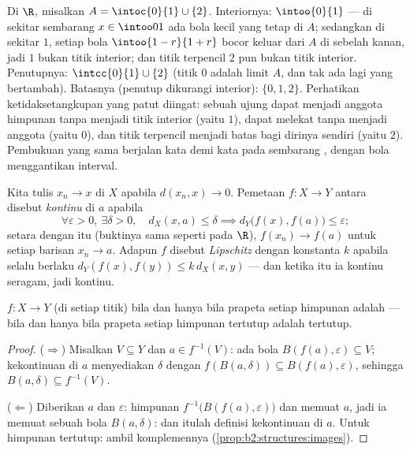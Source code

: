 \begin{example}\label{ex:b2:metric:intclosure}
Di $\R$, misalkan $A = \intoc{0}{1} \cup \{2\}$. Interiornya:
$\intoo{0}{1}$ --- di sekitar sembarang $x \in \intoo01$ ada bola kecil
yang tetap di $A$; sedangkan di sekitar $1$, setiap bola $\intoo{1-r}{1+r}$
bocor keluar dari $A$ di sebelah kanan, jadi $1$ bukan titik interior;
dan titik terpencil $2$ pun bukan titik interior. Penutupnya:
$\intcc{0}{1} \cup \{2\}$ (titik $0$ adalah limit $A$, dan tak ada
lagi yang bertambah). Batasnya (penutup dikurangi interior):
$\{0, 1, 2\}$. Perhatikan ketidaksetangkupan yang patut diingat: sebuah
ujung dapat menjadi anggota himpunan tanpa menjadi titik interior (yaitu
$1$), dapat melekat tanpa menjadi anggota (yaitu $0$), dan titik
terpencil menjadi batas bagi dirinya sendiri (yaitu $2$). Pembukuan yang
sama berjalan kata demi kata pada sembarang , dengan bola
menggantikan interval.
\end{example}

\begin{definition}\label{def:b2:metric:continuity}
Kita tulis $x_n \to x$ di $X$ apabila $d(x_n, x) \to 0$. Pemetaan $f
\colon X \to Y$ antara  disebut
\emph{kontinu} di $a$ apabila
\[
\forall \varepsilon > 0,\ \exists\delta > 0,\quad
d_X(x, a) \leq \delta \implies d_Y\bigl(f(x), f(a)\bigr) \leq
\varepsilon ;
\]
setara dengan itu (buktinya sama seperti pada $\R$), $f(x_n) \to f(a)$
untuk setiap barisan $x_n \to a$. Adapun $f$ disebut
\emph{Lipschitz} dengan konstanta $k$ apabila selalu
berlaku $d_Y(f(x), f(y)) \leq k\, d_X(x, y)$ --- dan ketika itu ia
kontinu seragam, jadi kontinu.
\end{definition}

\begin{theorem}\label{thm:b2:metric:globalcontinuity}
$f \colon X \to Y$  (di setiap titik) bila dan hanya bila
prapeta setiap himpunan  adalah  --- bila dan hanya bila
prapeta setiap himpunan tertutup adalah tertutup.
\end{theorem}

\begin{proof}
($\Rightarrow$) Misalkan $V \subseteq Y$  dan $a \in f^{-1}(V)$:
ada bola $B(f(a), \varepsilon) \subseteq V$; kekontinuan di $a$
menyediakan $\delta$ dengan $f(B(a, \delta)) \subseteq B(f(a),
\varepsilon)$, sehingga $B(a, \delta) \subseteq f^{-1}(V)$.

($\Leftarrow$) Diberikan $a$ dan $\varepsilon$: himpunan
$f^{-1}\bigl(B(f(a), \varepsilon)\bigr)$  dan memuat $a$, jadi ia
memuat sebuah bola $B(a, \delta)$: dan itulah definisi kekontinuan di
$a$. Untuk himpunan tertutup: ambil komplemennya
(\cref{prop:b2:structures:images}).
\end{proof}


